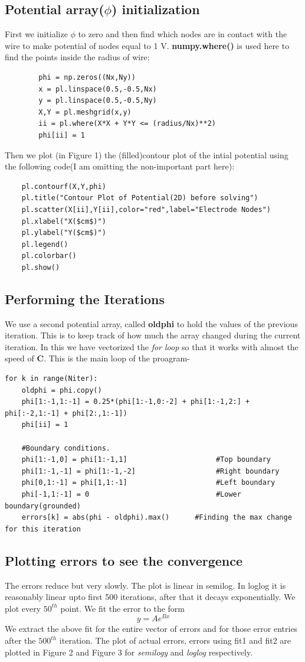 \documentclass[11pt, a4paper]{article}
\begin{document}
    \subsection{Potential array($\phi$) initialization}
    First we initialize $\phi$ to zero and then find which nodes are in contact with the wire to make potential of nodes equal to 1 V. \textbf{numpy.where()} is used here to find the points inside the radius of wire:
    \begin{verbatim}
        phi = np.zeros((Nx,Ny))
        x = pl.linspace(0.5,-0.5,Nx)
        y = pl.linspace(0.5,-0.5,Ny)
        X,Y = pl.meshgrid(x,y)
        ii = pl.where(X*X + Y*Y <= (radius/Nx)**2)
        phi[ii] = 1
    \end{verbatim}
    Then we plot (in Figure 1) the (filled)contour plot of the intial potential using the following code(I am omitting the non-important part here):
    \begin{verbatim}
    pl.contourf(X,Y,phi)    
    pl.title("Contour Plot of Potential(2D) before solving")
    pl.scatter(X[ii],Y[ii],color="red",label="Electrode Nodes")
    pl.xlabel("X($cm$)")
    pl.ylabel("Y($cm$)")
    pl.legend()
    pl.colorbar()
    pl.show()    
    \end{verbatim}
    \subsection{Performing the Iterations}
    We use a second potential array, called \textbf{oldphi} to hold the values of the previous iteration. This is to keep track of how much the array changed during the current iteration. In this we have vectorized the \textit{for loop} so that it works with almost the speed of \textbf{C}. This is the main loop of the proagram-
    \begin{verbatim}
for k in range(Niter):
    oldphi = phi.copy()
    phi[1:-1,1:-1] = 0.25*(phi[1:-1,0:-2] + phi[1:-1,2:] + phi[:-2,1:-1] + phi[2:,1:-1])
    phi[ii] = 1

    #Boundary conditions.
    phi[1:-1,0] = phi[1:-1,1]                     #Top boundary
    phi[1:-1,-1] = phi[1:-1,-2]                   #Right boundary
    phi[0,1:-1] = phi[1,1:-1]                     #Left boundary
    phi[-1,1:-1] = 0                              #Lower boundary(grounded)
    errors[k] = abs(phi - oldphi).max()      #Finding the max change for this iteration
    \end{verbatim}
    \subsection{Plotting errors to see the convergence}
    The errors reduce but very slowly. The plot is linear in semilog. In loglog it is reasonably linear upto first 500 iterations, after that it decays exponentially. We plot every $50^{th}$ point. We fit the error to the form
    \begin{equation*}
        y = Ae^{Bx}
    \end{equation*}
    We extract the above fit for the entire vector of errors and for those error entries after the $500^{th}$ iteration. The plot of actual errors, errors using fit1 and fit2 are plotted in Figure 2 and Figure 3 for \textit{semilogy} and \textit{loglog} respectively.
\end{document}
